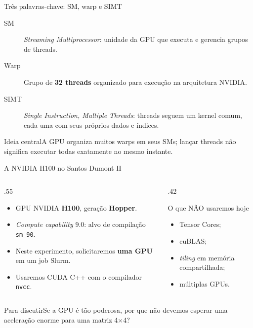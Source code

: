 \documentclass[aspectratio=169,11pt]{beamer}
\newcommand{\ideia}[1]{\begin{block}{Ideia central}#1\end{block}}
\newcommand{\pergunta}[1]{\begin{alertblock}{Para discutir}#1\end{alertblock}}
\begin{document}
\begin{frame}{Três palavras-chave: SM, warp e SIMT}
\begin{description}
\item[SM] \emph{Streaming Multiprocessor}: unidade da GPU que executa e gerencia grupos de threads.
\item[Warp] Grupo de \textbf{32 threads} organizado para execução na arquitetura NVIDIA.
\item[SIMT] \emph{Single Instruction, Multiple Threads}: threads seguem um kernel comum, cada uma com seus próprios dados e índices.
\end{description}
\ideia{A GPU organiza muitos warps em seus SMs; lançar threads não significa executar todas exatamente no mesmo instante.}
\end{frame}

\begin{frame}{A NVIDIA H100 no Santos Dumont II}
\begin{columns}[T]
\begin{column}{.55\linewidth}
\begin{itemize}
\item GPU NVIDIA \textbf{H100}, geração \textbf{Hopper}.
\item \emph{Compute capability} 9.0: alvo de compilação \texttt{sm\_90}.
\item Neste experimento, solicitaremos \textbf{uma GPU} em um job Slurm.
\item Usaremos CUDA C++ com o compilador \texttt{nvcc}.
\end{itemize}
\end{column}
\begin{column}{.42\linewidth}
\begin{block}{O que NÃO usaremos hoje}
\begin{itemize}
\item Tensor Cores;
\item cuBLAS;
\item \emph{tiling} em memória compartilhada;
\item múltiplas GPUs.
\end{itemize}
\end{block}
\end{column}
\end{columns}
\pergunta{Se a GPU é tão poderosa, por que não devemos esperar uma aceleração enorme para uma matriz 4×4?}
\end{frame}
\end{document}
